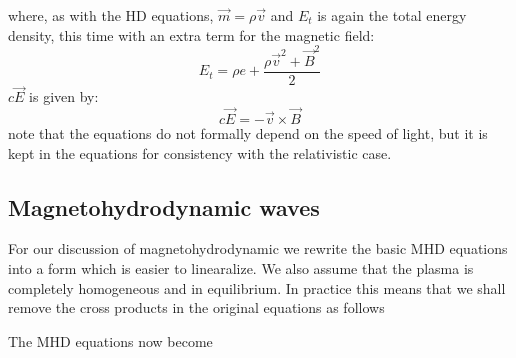 where, as with the HD equations, $\vec{m}=\rho\vec{v}$ and $E_t$ is again the total energy density, this time with an extra term for the magnetic field:
\begin{equation*}
	E_t = \rho e + \frac{\rho \vec{v}^2 + \vec{B}^2}{2}
\end{equation*}
$c\vec{E}$ is given by:
\begin{equation*}
	c\vec{E} = -\vec{v}\times \vec{B}
\end{equation*}
note that the equations do not formally depend on the speed of light, but it is kept in the equations for consistency with the relativistic case.
\subsection{Magnetohydrodynamic waves}


For our discussion of magnetohydrodynamic we rewrite the basic MHD equations into a form which is easier to linearalize. We also assume that the plasma is completely homogeneous and in equilibrium. In practice this means that we shall remove the cross products in the original equations as follows 

{\centering 
{}
\par}


The MHD equations now become

{\centering 
\noindent {}
\par}

